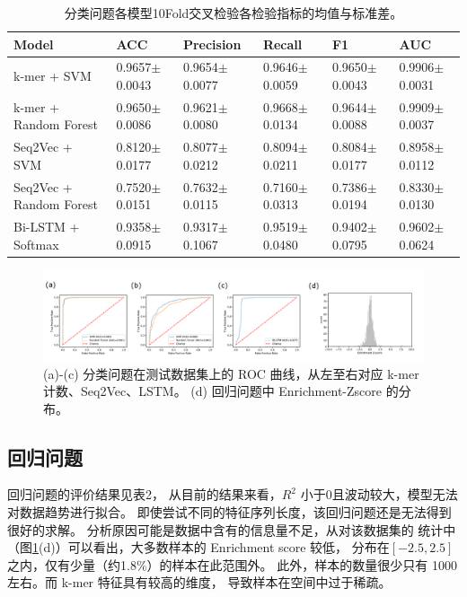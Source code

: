 \documentclass[UTF8]{ctexart}
\begin{document}
  \begin{table}[h]
    \label{tab:res_clf}
    \begin{tabular}{llllll}
    \hline
    Model                   & ACC           & Precision     & Recall        & F1            & AUC           \\ \hline
    k-mer + SVM             & 0.9657$\pm$0.0043 & 0.9654$\pm$0.0077 & 0.9646$\pm$0.0059 & 0.9650$\pm$0.0043 & 0.9906$\pm$0.0031 \\
    k-mer + Random Forest   & 0.9650$\pm$0.0086 & 0.9621$\pm$0.0080 & 0.9668$\pm$0.0134 & 0.9644$\pm$0.0088 & 0.9909$\pm$0.0037 \\
    Seq2Vec + SVM           & 0.8120$\pm$0.0177 & 0.8077$\pm$0.0212 & 0.8094$\pm$0.0211 & 0.8084$\pm$0.0177 & 0.8958$\pm$0.0112 \\
    Seq2Vec + Random Forest & 0.7520$\pm$0.0151 & 0.7632$\pm$0.0115 & 0.7160$\pm$0.0313 & 0.7386$\pm$0.0194 & 0.8330$\pm$0.0130 \\
    Bi-LSTM + Softmax       & 0.9358$\pm$0.0915 & 0.9317$\pm$0.1067 & 0.9519$\pm$0.0480 & 0.9402$\pm$0.0795 & 0.9602$\pm$0.0624 \\ \hline
    \end{tabular}
    \caption{分类问题各模型10Fold交叉检验各检验指标的均值与标准差。}
  \end{table}

  \begin{figure}[h!]
  \centering
  \includegraphics[width=1\textwidth]{imgs/result.pdf}
  \caption{(a)-(c) 分类问题在测试数据集上的 ROC 曲线，从左至右对应 k-mer 计数、Seq2Vec、LSTM。
  (d) 回归问题中 Enrichment-Zscore 的分布。}
  \label{fig:result}
  \end{figure}

  \subsection{回归问题}
  回归问题的评价结果见表2，
  从目前的结果来看，$R^2$ 小于0且波动较大，模型无法对数据趋势进行拟合。
  即使尝试不同的特征序列长度，该回归问题还是无法得到很好的求解。
  分析原因可能是数据中含有的信息量不足，从对该数据集的
  统计中（图\ref{fig:result}(d)）可以看出，大多数样本的 Enrichment score 较低，
  分布在$[-2.5, 2.5]$之内，仅有少量（约1.8\%）的样本在此范围外。
  此外，样本的数量很少只有 1000 左右。而 k-mer 特征具有较高的维度，
  导致样本在空间中过于稀疏。
\end{document}
